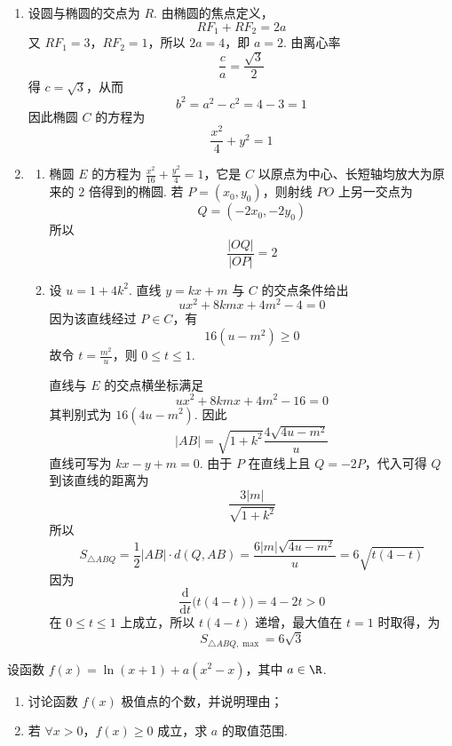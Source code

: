 \begin{solution}
\begin{enumerate}
\item 设圆与椭圆的交点为 \(R\). 由椭圆的焦点定义，
\[
RF_1+RF_2=2a
\]
又 \(RF_1=3\)，\(RF_2=1\)，所以 \(2a=4\)，即 \(a=2\). 由离心率
\[
\frac ca=\frac{\sqrt3}{2}
\]
得 \(c=\sqrt3\)，从而
\[
b^2=a^2-c^2=4-3=1
\]
因此椭圆 \(C\) 的方程为
\[
\frac{x^2}{4}+y^2=1
\]
\item
\begin{enumerate}
\item 椭圆 \(E\) 的方程为 \(\frac{x^2}{16}+\frac{y^2}{4}=1\)，它是 \(C\) 以原点为中心、长短轴均放大为原来的 \(2\) 倍得到的椭圆. 若 \(P=(x_0,y_0)\)，则射线 \(PO\) 上另一交点为
\[
Q=(-2x_0,-2y_0)
\]
所以
\[
\frac{|OQ|}{|OP|}=2
\]
\item 设 \(u=1+4k^2\). 直线 \(y=kx+m\) 与 \(C\) 的交点条件给出
\[
ux^2+8kmx+4m^2-4=0
\]
因为该直线经过 \(P\in C\)，有
\[
16(u-m^2)\geqslant0
\]
故令 \(t=\frac{m^2}{u}\)，则 \(0\leqslant t\leqslant1\).

直线与 \(E\) 的交点横坐标满足
\[
ux^2+8kmx+4m^2-16=0
\]
其判别式为 \(16(4u-m^2)\). 因此
\[
|AB|=\sqrt{1+k^2}\frac{4\sqrt{4u-m^2}}{u}
\]
直线可写为 \(kx-y+m=0\). 由于 \(P\) 在直线上且 \(Q=-2P\)，代入可得 \(Q\) 到该直线的距离为
\[
\frac{3|m|}{\sqrt{1+k^2}}
\]
所以
\[
S_{\triangle ABQ}
=\frac12|AB|\cdot d(Q,AB)
=\frac{6|m|\sqrt{4u-m^2}}{u}
=6\sqrt{t(4-t)}
\]
因为
\[
\frac{\mathrm d}{\mathrm dt}\bigl(t(4-t)\bigr)=4-2t>0
\]
在 \(0\leqslant t\leqslant1\) 上成立，所以 \(t(4-t)\) 递增，最大值在 \(t=1\) 时取得，为
\[
S_{\triangle ABQ,\max}=6\sqrt3
\]
\end{enumerate}
\end{enumerate}
\end{solution}

\begin{problem}
设函数 \(f(x) = \ln(x + 1) + a(x^2 - x)\)，其中 \(a \in \R\).
\begin{enumerate}
\item 讨论函数 \(f(x)\) 极值点的个数，并说明理由；
\item 若 \(\forall x > 0\)，\(f(x) \geqslant 0\) 成立，求 \(a\) 的取值范围.
\end{enumerate}
\end{problem}

